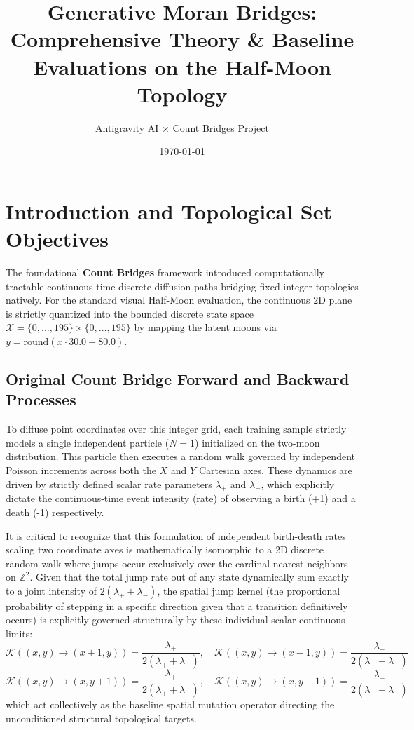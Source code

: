 \documentclass{article}
\title{Generative Moran Bridges: Comprehensive Theory \& Baseline Evaluations on the Half-Moon Topology}
\author{Antigravity AI $\times$ Count Bridges Project}
\date{\today}
\begin{document}
\maketitle

\section{Introduction and Topological Set Objectives}
The foundational \textbf{Count Bridges} framework introduced computationally tractable continuous-time discrete diffusion paths bridging fixed integer topologies natively. For the standard visual Half-Moon evaluation, the continuous 2D plane is strictly quantized into the bounded discrete state space \(\mathcal{X} = \{0, \dots, 195\} \times \{0, \dots, 195\}\) by mapping the latent moons via \(y = \text{round}(x \cdot 30.0 + 80.0)\). 

\subsection{Original Count Bridge Forward and Backward Processes}
To diffuse point coordinates over this integer grid, each training sample strictly models a single independent particle (\(N=1\)) initialized on the two-moon distribution. This particle then executes a random walk governed by independent Poisson increments across both the \(X\) and \(Y\) Cartesian axes. These dynamics are driven by strictly defined scalar rate parameters \(\lambda_{+}\) and \(\lambda_{-}\), which explicitly dictate the continuous-time event intensity (rate) of observing a birth (+1) and a death (-1) respectively. 

It is critical to recognize that this formulation of independent birth-death rates scaling two coordinate axes is mathematically isomorphic to a 2D discrete random walk where jumps occur exclusively over the cardinal nearest neighbors on \(\mathbb{Z}^2\). Given that the total jump rate out of any state dynamically sum exactly to a joint intensity of \(2(\lambda_{+} + \lambda_{-})\), the spatial jump kernel (the proportional probability of stepping in a specific direction given that a transition definitively occurs) is explicitly governed structurally by these individual scalar continuous limits:
\[
\mathcal{K}((x,y) \to (x + 1, y)) = \frac{\lambda_{+}}{2(\lambda_{+} + \lambda_{-})}, \quad \mathcal{K}((x,y) \to (x - 1, y)) = \frac{\lambda_{-}}{2(\lambda_{+} + \lambda_{-})}
\]
\[
\mathcal{K}((x,y) \to (x, y + 1)) = \frac{\lambda_{+}}{2(\lambda_{+} + \lambda_{-})}, \quad \mathcal{K}((x,y) \to (x, y - 1)) = \frac{\lambda_{-}}{2(\lambda_{+} + \lambda_{-})}
\]
which act collectively as the baseline spatial mutation operator directing the unconditioned structural topological targets.
\end{document}
